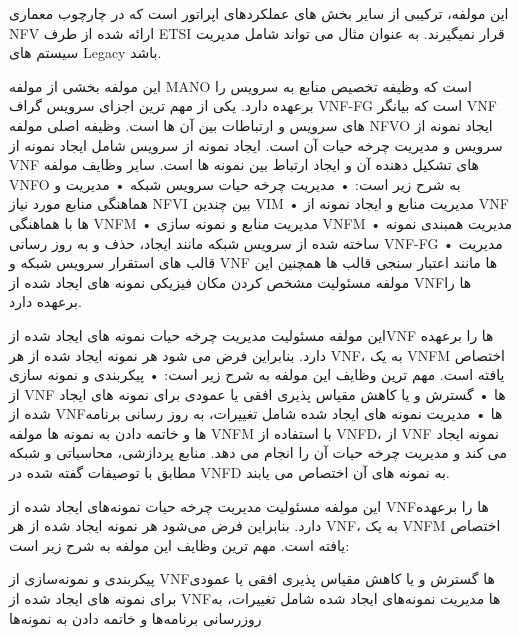 
این مولفه، ترکیبی از سایر بخش های عملکردهای اپراتور است که در چارچوب معماری NFV ارائه شده از طرف ETSI قرار نمیگیرند. به عنوان مثال می تواند شامل مدیریت سیستم های Legacy باشد.


این مولفه بخشی از مولفه MANO است که وظیفه تخصیص منابع به سرویس را برعهده دارد. یکی از مهم ترین اجزای سرویس گراف VNF-FG است که بیانگر VNF های سرویس و ارتباطات بین آن ها است. وظیفه اصلی مولفه NFVO ایجاد نمونه از سرویس و مدیریت چرخه حیات آن است. ایجاد نمونه از سرویس شامل ایجاد نمونه از VNF های تشکیل دهنده آن و ایجاد ارتباط بین نمونه ها است. سایر وظایف مولفه VNFO به شرح زیر است:
    • مدیریت چرخه حیات سرویس شبکه
    • مدیریت و هماهنگی منابع مورد نیاز NFVI بین چندین VIM
    • مدیریت منابع و ایجاد نمونه از VNF ها با هماهنگی VNFM
    • مدیریت منابع و نمونه سازی VNFM
    • مدیریت همبندی نمونه ساخته شده از سرویس شبکه مانند ایجاد، حذف و به روز رسانی VNF-FG
    • مدیریت قالب های استقرار سرویس شبکه و VNF ها مانند اعتبار سنجی قالب ها
همچنین این مولفه مسئولیت مشخص کردن مکان فیزیکی نمونه های ایجاد شده از VNFها را برعهده دارد.


این مولفه مسئولیت مدیریت چرخه حیات نمونه های ایجاد شده ازVNF ها را برعهده دارد. بنابراین فرض می شود هر نمونه ایجاد شده از هر VNF، به یک VNFM اختصاص یافته است. مهم ترین وظایف این مولفه به شرح زیر است:
    • پیکربندی و نمونه سازی از VNF ها
    • گسترش و یا کاهش مقیاس پذیری افقی یا عمودی برای نمونه های ایجاد شده از VNFها
    • مدیریت نمونه های ایجاد شده شامل  تغییرات، به روز رسانی برنامه ها و خاتمه دادن به نمونه ها
مولفه VNFM با استفاده از VNFD، از VNF نمونه ایجاد می کند و مدیریت چرخه حیات آن را انجام می دهد. منابع پردازشی، محاسباتی و شبکه مطابق با توصیفات گفته شده در VNFD به نمونه های آن اختصاص می یابند.


این مولفه مسئولیت مدیریت چرخه حیات نمونه‌های ایجاد شده از VNFها را برعهده دارد. بنابراین فرض می‌شود هر نمونه ایجاد شده از هر VNF، به یک VNFM اختصاص یافته است.
مهم ترین وظایف این مولفه به شرح زیر است:


 پیکربندی و نمونه‌سازی از VNFها
 گسترش و یا کاهش مقیاس پذیری افقی یا عمودی برای نمونه های ایجاد شده از VNFها
 مدیریت نمونه‌های ایجاد شده شامل تغییرات، به روزرسانی برنامه‌ها و خاتمه دادن به نمونه‌ها

